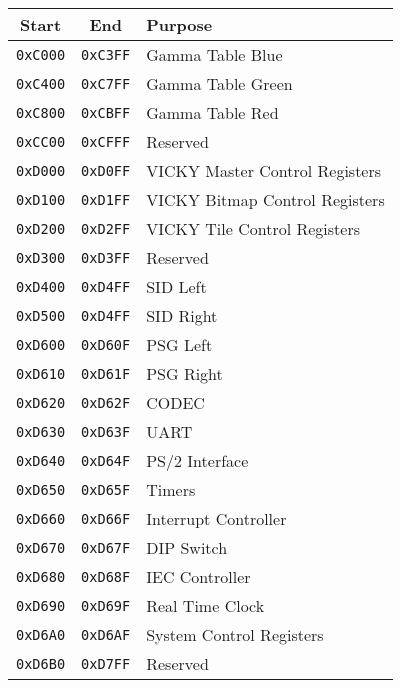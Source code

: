 \begin{table}[ht]
    \begin{center}
        \begin{tabular}{|c|c|l|} \hline
            Start & End & Purpose \\ \hline \hline
            \verb+0xC000+ & \verb+0xC3FF+ & Gamma Table Blue \\ \hline
            \verb+0xC400+ & \verb+0xC7FF+ & Gamma Table Green \\ \hline
            \verb+0xC800+ & \verb+0xCBFF+ & Gamma Table Red \\ \hline
            \verb+0xCC00+ & \verb+0xCFFF+ & Reserved \\ \hline
            \verb+0xD000+ & \verb+0xD0FF+ & VICKY Master Control Registers \\ \hline
            \verb+0xD100+ & \verb+0xD1FF+ & VICKY Bitmap Control Registers \\ \hline
            \verb+0xD200+ & \verb+0xD2FF+ & VICKY Tile Control Registers \\ \hline
            \verb+0xD300+ & \verb+0xD3FF+ & Reserved \\ \hline
            \verb+0xD400+ & \verb+0xD4FF+ & SID Left \\ \hline
            \verb+0xD500+ & \verb+0xD4FF+ & SID Right \\ \hline
            \verb+0xD600+ & \verb+0xD60F+ & PSG Left \\ \hline
            \verb+0xD610+ & \verb+0xD61F+ & PSG Right \\ \hline
            \verb+0xD620+ & \verb+0xD62F+ & CODEC \\ \hline
            \verb+0xD630+ & \verb+0xD63F+ & UART \\ \hline
            \verb+0xD640+ & \verb+0xD64F+ & PS/2 Interface \\ \hline
            \verb+0xD650+ & \verb+0xD65F+ & Timers \\ \hline
            \verb+0xD660+ & \verb+0xD66F+ & Interrupt Controller \\ \hline
            \verb+0xD670+ & \verb+0xD67F+ & DIP Switch \\ \hline
            \verb+0xD680+ & \verb+0xD68F+ & IEC Controller \\ \hline
            \verb+0xD690+ & \verb+0xD69F+ & Real Time Clock \\ \hline
            \verb+0xD6A0+ & \verb+0xD6AF+ & System Control Registers \\ \hline
            \verb+0xD6B0+ & \verb+0xD7FF+ & Reserved \\ \hline

\end{tabular}
\end{center}
\end{table}
